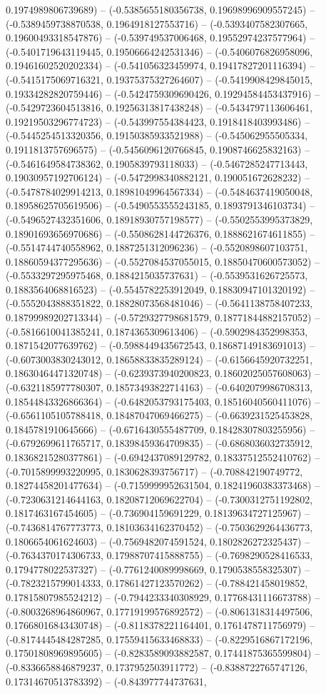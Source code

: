 0.1974989806739689) -- (-0.5385655180356738, 0.19698996909557245) -- (-0.5389459738870538, 0.1964918127553716) -- (-0.5393407582307665, 0.19600493318547876) -- (-0.539749537006468, 0.19552974237577964) -- (-0.5401719643119445, 0.19506664242531346) -- (-0.5406076826958096, 0.19461602520202334) -- (-0.541056323459974, 0.19417827201116394) -- (-0.5415175069716321, 0.19375375327264607) -- (-0.5419908429845015, 0.19334282820759446) -- (-0.5424759309690426, 0.19294584453437916) -- (-0.5429723604513816, 0.19256313817438248) -- (-0.5434797113606461, 0.19219503296774723) -- (-0.543997554384423, 0.1918418403993486) -- (-0.5445254513320356, 0.19150385933521988) -- (-0.545062955505334, 0.1911813757696575) -- (-0.5456096120766845, 0.1908746625832163) -- (-0.5461649584738362, 0.1905839793118033) -- (-0.5467285247713443, 0.19030957192706124) -- (-0.5472998340882121, 0.190051672628232) -- (-0.5478784029914213, 0.18981049964567334) -- (-0.5484637419050048, 0.18958625705619506) -- (-0.5490553555243185, 0.1893791346103734) -- (-0.5496527432351606, 0.18918930757198577) -- (-0.5502553995373829, 0.18901693656970686) -- (-0.5508628144726376, 0.1888621674611855) -- (-0.5514744740558962, 0.1887251312096236) -- (-0.5520898607103751, 0.18860594377295636) -- (-0.5527084537055015, 0.18850470600573052) -- (-0.5533297295975468, 0.1884215035737631) -- (-0.5539531626725573, 0.1883564068816523) -- (-0.5545782253912049, 0.18830947101320192) -- (-0.5552043888351822, 0.18828073568481046) -- (-0.5641138758407233, 0.18799989202713344) -- (-0.5729327798681579, 0.18771844882157052) -- (-0.5816610041385241, 0.1874365309613406) -- (-0.5902984352998353, 0.1871542077639762) -- (-0.5988449435672543, 0.18687149183691013) -- (-0.6073003830243012, 0.18658833835289124) -- (-0.6156645920732251, 0.18630464471320748) -- (-0.6239373940200823, 0.18602025057608063) -- (-0.6321185977780307, 0.18573493822714163) -- (-0.6402079986708313, 0.18544843326866364) -- (-0.6482053793175403, 0.18516040560411076) -- (-0.6561105105788418, 0.18487047069466275) -- (-0.6639231525453828, 0.1845781910645666) -- (-0.6716430555487709, 0.18428307803255956) -- (-0.6792699611765717, 0.18398459364709835) -- (-0.6868036032735912, 0.18368215280377861) -- (-0.6942437089129782, 0.18337512552410762) -- (-0.7015899993220995, 0.1830628393756717) -- (-0.708842190749772, 0.18274458201477634) -- (-0.7159999952631504, 0.18241960383373468) -- (-0.7230631214644163, 0.18208712069622704) -- (-0.7300312751192802, 0.1817463167454605) -- (-0.736904159691229, 0.18139634727125967) -- (-0.7436814767773773, 0.18103634162370452) -- (-0.7503629264436773, 0.1806654061624603) -- (-0.7569482074591524, 0.1802826272325437) -- (-0.7634370174306733, 0.17988707415888755) -- (-0.7698290528416533, 0.1794778022537327) -- (-0.7761240089998669, 0.1790538558325307) -- (-0.7823215799014333, 0.17861427123570262) -- (-0.788421458019852, 0.17815807985524212) -- (-0.7944233340308929, 0.17768431116673788) -- (-0.8003268964860967, 0.17719199576892572) -- (-0.8061318314497506, 0.17668016843430748) -- (-0.8118378221164401, 0.1761478711756979) -- (-0.8174445484287285, 0.17559415633468833) -- (-0.8229516867172196, 0.17501808969895605) -- (-0.8283589093882587, 0.17441875365599804) -- (-0.8336658846879237, 0.1737952503911772) -- (-0.8388722765747126, 0.17314670513783392) -- (-0.843977744737631, 